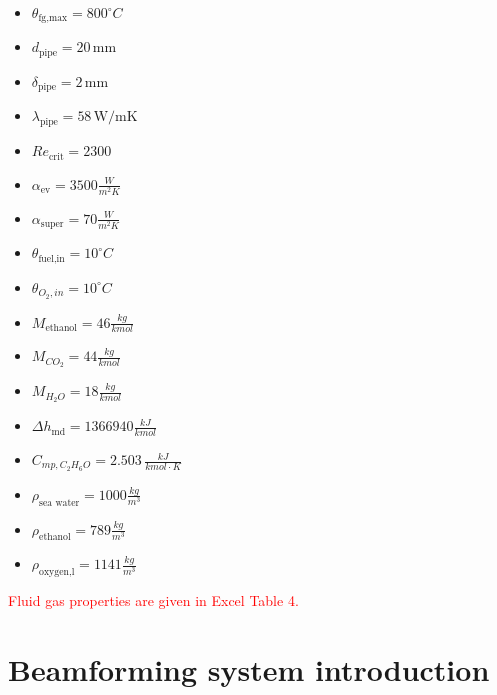 \documentclass{article}
\begin{document}
	\begin{itemize}
		\item $\theta_\textrm{fg,max} = 800 ^\circ C$
		\item $d_\textrm{pipe} = 20 \,\textrm{mm}$
		\item $\delta_\textrm{pipe} = 2 \,\textrm{mm}$
		\item $\lambda_\textrm{pipe}  = 58 \,\textrm{W/mK}$
		\item $Re_\textrm{crit} = 2300$
		\item $\alpha_\textrm{ev} = 3500 \frac{W}{m^2K}$
		\item $\alpha_\textrm{super} = 70 \frac{W}{m^2K}$
		\item $\theta_\textrm{fuel,in} = 10 ^\circ C$
		\item $\theta_{O_2,in} = 10 ^\circ C$
		\item $M_\textrm{ethanol} = 46 \frac{kg}{kmol}$
		\item $M_{CO_2} = 44 \frac{kg}{kmol}$
		\item $M_{H_2O} = 18 \frac{kg}{kmol}$
		\item $\Delta h_\textrm{md} = 1366940 \frac{kJ}{kmol}$
		\item $C_{mp,C_2H_6O} = 2.503 \,\frac{kJ}{kmol \cdot K}$
		\item $\rho_\textrm{sea\ water} = 1000 \frac{kg}{m^3}$
		\item $\rho_\textrm{ethanol} = 789 \frac{kg}{m^3}$
		\item $\rho_\textrm{oxygen,l} = 1141 \frac{kg}{m^3}$
	\end{itemize}

	\noindent
	\textcolor{red}{Fluid gas properties are given in Excel Table 4.}

\clearpage

\section{Beamforming system introduction}
\end{document}
